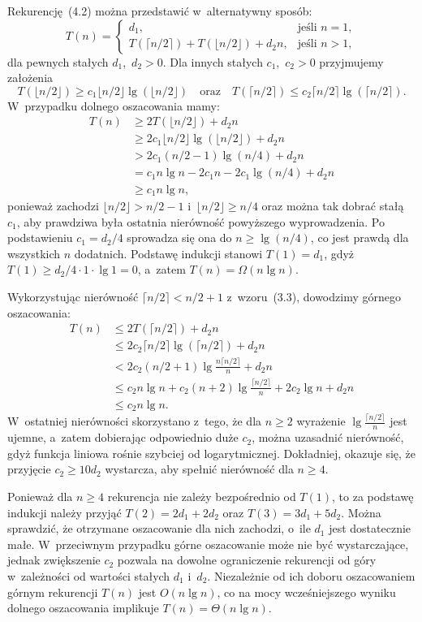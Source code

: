 \exercise %
Rekurencję~(4.2) można przedstawić w~alternatywny sposób:
\[
	T(n) =
	\begin{cases}
		d_1, & \text{jeśli $n=1$}, \\
		T(\lceil n/2\rceil)+T(\lfloor n/2\rfloor)+d_2n, & \text{jeśli $n>1$},
	\end{cases}
\]
dla pewnych stałych $d_1$,~$d_2>0$. Dla innych stałych $c_1$,~$c_2>0$ przyjmujemy założenia
\[
	T(\lfloor n/2\rfloor) \ge c_1\lfloor n/2\rfloor\lg(\lfloor n/2\rfloor) \quad\text{oraz}\quad T(\lceil n/2\rceil) \le c_2\lceil n/2\rceil\lg(\lceil n/2\rceil).
\]
W~przypadku dolnego oszacowania mamy:
\begin{align*}
	T(n) &\ge 2T(\lfloor n/2\rfloor)+d_2n \\
	&\ge 2c_1\lfloor n/2\rfloor\lg(\lfloor n/2\rfloor)+d_2n \\
	&> 2c_1(n/2-1)\lg(n/4)+d_2n \\
	&= c_1n\lg n-2c_1n-2c_1\!\lg(n/4)+d_2n \\
	&\ge c_1n\lg n,
\end{align*}
ponieważ zachodzi $\lfloor n/2\rfloor>n/2-1$ i~$\lfloor n/2\rfloor\ge n/4$ oraz można tak dobrać stałą $c_1$, aby prawdziwa była ostatnia nierówność powyższego wyprowadzenia. Po podstawieniu $c_1=d_2/4$ sprowadza się ona do $n\ge\lg(n/4)$, co jest prawdą dla wszystkich $n$ dodatnich. Podstawę indukcji stanowi $T(1)=d_1$, gdyż $T(1)\ge d_2/4\cdot 1\cdot\lg1=0$, a~zatem $T(n)=\Omega(n\lg n)$.

Wykorzystując nierówność $\lceil n/2\rceil<n/2+1$ z~wzoru~(3.3), dowodzimy górnego oszacowania:
\begin{align*}
	T(n) &\le 2T(\lceil n/2\rceil)+d_2n \\
	&\le 2c_2\lceil n/2\rceil\lg(\lceil n/2\rceil)+d_2n \\
	&< 2c_2(n/2+1)\lg\frac{n\lceil n/2\rceil}{n}+d_2n \\
	&\le c_2n\lg n+c_2(n+2)\lg\frac{\lceil n/2\rceil}{n}+2c_2\lg n+d_2n \\
	&\le c_2n\lg n.
\end{align*}
W~ostatniej nierówności skorzystano z~tego, że dla $n\ge2$ wyrażenie $\lg\frac{\lceil n/2\rceil}{n}$ jest ujemne, a~zatem dobierając odpowiednio duże $c_2$, można uzasadnić nierówność, gdyż funkcja liniowa rośnie szybciej od logarytmicznej. Dokładniej, okazuje się, że przyjęcie $c_2\ge10d_2$ wystarcza, aby spełnić nierówność dla $n\ge4$.

Ponieważ dla $n\ge4$ rekurencja nie zależy bezpośrednio od $T(1)$, to za podstawę indukcji należy przyjąć $T(2)=2d_1+2d_2$ oraz $T(3)=3d_1+5d_2$. Można sprawdzić, że otrzymane oszacowanie dla nich zachodzi, o~ile $d_1$ jest dostatecznie małe. W~przeciwnym przypadku górne oszacowanie może nie być wystarczające, jednak zwiększenie $c_2$ pozwala na dowolne ograniczenie rekurencji od góry w~zależności od wartości stałych $d_1$ i~$d_2$. Niezależnie od ich doboru oszacowaniem górnym rekurencji $T(n)$ jest $O(n\lg n)$, co na mocy wcześniejszego wyniku dolnego oszacowania implikuje $T(n)=\Theta(n\lg n)$.

